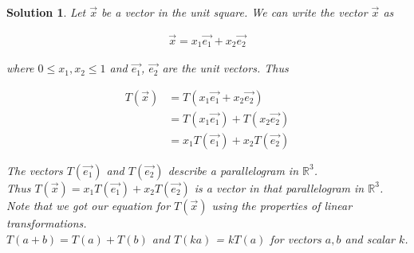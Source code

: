 \documentclass{article}
\newtheorem*{solution}{Solution}
\begin{document}
\begin{solution}
Let $\vec{x}$ be a vector in the unit square. We can write the vector $\vec{x}$ as 

\begin{align*}
\vec{x} = x_{1} \vec{e_{1}} + x_{2} \vec{e_{2}}
\end{align*}
 
where $0 \leq x_{1}, x_{2} \leq 1$ and $\vec{e_{1}}$, $\vec{e_{2}}$ are the unit vectors. Thus

\begin{align*}
T(\vec{x}) &= T(x_{1} \vec{e_{1}} + x_{2} \vec{e_{2}}) \\\
&= T(x_{1} \vec{e_{1}}) + T(x_{2} \vec{e_{2}}) \\
&= x_{1} T(\vec{e_{1}}) + x_{2} T(\vec{e_{2}}) 
\end{align*}

The vectors $T(\vec{e_{1}})$ and $T(\vec{e_{2}})$ describe a parallelogram in $\mathbb{R}^3$. \\

Thus $T(\vec{x}) =  x_{1} T(\vec{e_{1}}) + x_{2} T(\vec{e_{2}})$ is a vector in that parallelogram in $\mathbb{R}^3$. \\

Note that we got our equation for $T(\vec{x})$ using the properties of linear transformations. \\

$T(a+b) = T(a) + T(b)$ and $T(ka)$ = $kT(a)$ for vectors $a, b$ and scalar $k$.
\end{solution} 
\end{document}
